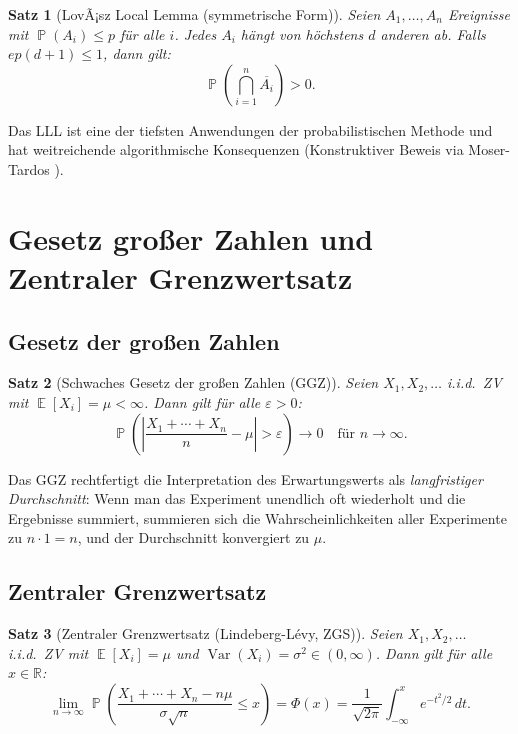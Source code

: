 ﻿\documentclass[12pt,a4paper]{article}
\theoremstyle{definition}
\theoremstyle{plain}
\newtheorem{satz}{Satz}[section]
\theoremstyle{remark}
\DeclareMathOperator{\E}{\mathbb{E}}
\DeclareMathOperator{\Var}{Var}
\DeclareMathOperator{\Prob}{\mathbb{P}}
\begin{document}
\begin{satz}[LovÃ¡sz Local Lemma (symmetrische Form)]\label{satz:lll}
  Seien $A_1, \ldots, A_n$ Ereignisse mit $\Prob(A_i) \leq p$ für alle $i$.
  Jedes $A_i$ hängt von höchstens $d$ anderen ab. Falls $ep(d+1) \leq 1$,
  dann gilt:
  \[
    \Prob\!\left(\bigcap_{i=1}^n \overline{A_i}\right) > 0.
  \]
\end{satz}

Das LLL ist eine der tiefsten Anwendungen der probabilistischen Methode und
hat weitreichende algorithmische Konsequenzen (Konstruktiver Beweis via
Moser-Tardos \cite{moser2010constructive}).

\section{Gesetz großer Zahlen und Zentraler Grenzwertsatz}
\label{sec:ggz}

\subsection{Gesetz der großen Zahlen}

\begin{satz}[Schwaches Gesetz der großen Zahlen (GGZ)]\label{satz:sggz}
  Seien $X_1, X_2, \ldots$ i.i.d.\ ZV mit $\E[X_i] = \mu < \infty$. Dann gilt
  für alle $\varepsilon > 0$:
  \[
    \Prob\!\left(\left|\frac{X_1 + \cdots + X_n}{n} - \mu\right| > \varepsilon\right) \to 0
    \quad \text{für } n \to \infty.
  \]
\end{satz}

Das GGZ rechtfertigt die Interpretation des Erwartungswerts als
\emph{langfristiger Durchschnitt}: Wenn man das Experiment unendlich oft
wiederholt und die Ergebnisse summiert, summieren sich die
Wahrscheinlichkeiten aller Experimente zu $n \cdot 1 = n$, und der
Durchschnitt konvergiert zu $\mu$.

\subsection{Zentraler Grenzwertsatz}

\begin{satz}[Zentraler Grenzwertsatz (Lindeberg-Lévy, ZGS)]\label{satz:zgs}
  Seien $X_1, X_2, \ldots$ i.i.d.\ ZV mit $\E[X_i] = \mu$ und
  $\Var(X_i) = \sigma^2 \in (0,\infty)$. Dann gilt für alle $x \in \mathbb{R}$:
  \[
    \lim_{n\to\infty} \Prob\!\left(\frac{X_1+\cdots+X_n - n\mu}{\sigma\sqrt{n}} \leq x\right)
    = \Phi(x) = \frac{1}{\sqrt{2\pi}}\int_{-\infty}^x e^{-t^2/2}\,dt.
  \]
\end{satz}
\end{document}
